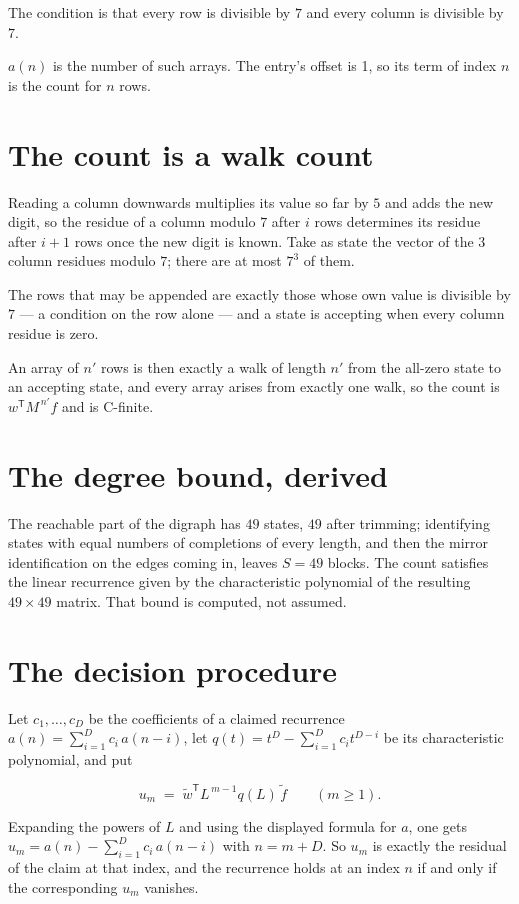 \documentclass[11pt]{article}
\theoremstyle{definition}
\begin{document}
The condition is that every row is divisible by $7$ and every column is divisible by $7$.

$a(n)$ is the number of such arrays. The entry's offset is 1, so its term of index $n$ is the count for $n$ rows.

\section{The count is a walk count}

Reading a column downwards multiplies its value so far by $5$ and adds the new digit, so the residue of a column modulo $7$ after $i$ rows determines its residue after $i+1$ rows once the new digit is known. Take as state the vector of the $3$ column residues modulo $7$; there are at most $7^{3}$ of them.

The rows that may be appended are exactly those whose own value is divisible by $7$ --- a condition on the row alone --- and a state is accepting when every column residue is zero.

An array of $n'$ rows is then exactly a walk of length $n'$ from the all-zero state to an accepting state, and every array arises from exactly one walk, so the count is $w^{\mathsf T}M^{\,n'}f$ and is C-finite.

\section{The degree bound, derived}

The reachable part of the digraph has $49$ states, $49$ after trimming; identifying states with equal numbers of completions of every length, and then the mirror identification on the edges coming in, leaves $S = 49$ blocks. The count satisfies the linear recurrence given by the characteristic polynomial of the resulting $49\times49$ matrix. That bound is computed, not assumed.

\section{The decision procedure}

Let $c_1,\dots,c_D$ be the coefficients of a claimed recurrence $a(n) = \sum_{i=1}^{D} c_i\,a(n-i)$, let $q(t) = t^{D} - \sum_{i=1}^{D} c_i t^{D-i}$ be its characteristic polynomial, and put

\[u_m \;=\; \tilde w^{\mathsf T} L^{\,m-1} q(L)\,\tilde f \qquad (m \ge 1).\]

Expanding the powers of $L$ and using the displayed formula for $a$, one gets $u_m = a(n) - \sum_{i=1}^{D} c_i\,a(n-i)$ with $n = m + D$. So $u_m$ is exactly the residual of the claim at that index, and the recurrence holds at an index $n$ if and only if the corresponding $u_m$ vanishes.
\end{document}

